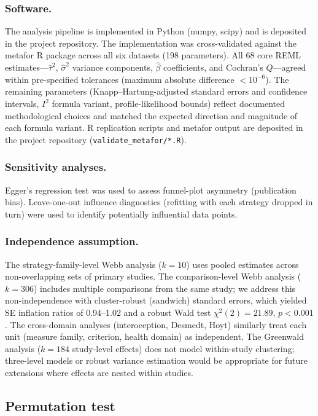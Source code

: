 \documentclass[11pt]{article}
\begin{document}
\subsubsection*{Software.}
The analysis pipeline is implemented in Python (numpy, scipy) and is
deposited in the project repository. The implementation was cross-validated
against the metafor R package\cite{Viechtbauer2010} across all six
datasets (198 parameters). All 68 core REML estimates---$\hat\tau^2$,
$\hat\sigma^2$ variance components, $\hat\beta$ coefficients, and
Cochran's $Q$---agreed within pre-specified tolerances (maximum
absolute difference $< 10^{-6}$). The remaining parameters
(Knapp--Hartung-adjusted standard errors and confidence intervals, $I^2$
formula variant, profile-likelihood bounds) reflect documented
methodological choices and matched the expected direction and magnitude
of each formula variant. R replication scripts and metafor output are
deposited in the project repository
(\texttt{validate\_metafor/*.R}).

\subsubsection*{Sensitivity analyses.}
Egger's regression test\cite{Egger1997} was used to assess funnel-plot
asymmetry (publication bias). Leave-one-out influence diagnostics
(refitting with each strategy dropped in turn) were used to identify
potentially influential data points.

\subsubsection*{Independence assumption.}
The strategy-family-level Webb analysis ($k = 10$) uses pooled estimates
across non-overlapping sets of primary studies. The comparison-level
Webb analysis ($k = 306$) includes multiple comparisons from the same
study; we address this non-independence with cluster-robust (sandwich)
standard errors, which yielded SE inflation ratios of 0.94--1.02 and
a robust Wald test $\chi^2(2) = 21.89$, $p < 0.001$. The cross-domain
analyses (interoception, Desmedt, Hoyt) similarly treat each unit
(measure family, criterion, health domain) as independent. The Greenwald
analysis ($k = 184$ study-level effects) does not model within-study
clustering; three-level models or robust variance estimation would be
appropriate for future extensions where effects are nested within
studies.


\subsection{Permutation test}
\end{document}
